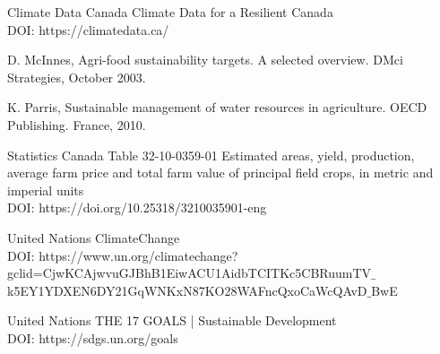 \documentclass[11pt]{article}
\numberwithin{equation}{section}
\begin{document}

\begin{thebibliography}{99}

{\sc Climate Data Canada}
Climate Data for a Resilient Canada \\
{\sc DOI:} https://climatedata.ca/

{\sc D. McInnes},
Agri-food sustainability targets. A selected overview. DMci Strategies, October 2003.

{\sc K. Parris},
Sustainable management of water resources in agriculture. OECD Publishing. France, 2010.

{\sc Statistics Canada}
Table 32-10-0359-01  Estimated areas, yield, production, average farm price and total farm value of principal field crops, in metric and imperial units \\
{\sc DOI:}  https://doi.org/10.25318/3210035901-eng

{\sc United Nations}
ClimateChange \\
{\sc DOI:} https://www.un.org/climatechange?gclid=CjwKCAjwvuGJBhB1EiwACU1AidbTCITKc5CBRuumTV$\_$k5EY1YDXEN6DY21GqWNKxN87KO28WAFncQxoCaWcQAvD$\_$BwE

{\sc United Nations}
THE 17 GOALS | Sustainable Development \\
{\sc DOI:} https://sdgs.un.org/goals

\end{thebibliography}
\end{document}

